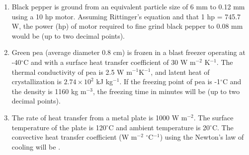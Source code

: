 \documentclass[a4paper,10pt]{article}
\begin{document}
\begin{enumerate}
    \item Black pepper is ground from an equivalent particle size of 6 mm to 0.12 mm using a 10 hp motor. Assuming Rittinger's equation and that 1 hp = 745.7 W, the power (hp) of motor required to fine grind black pepper to 0.08 mm would be \underline{\hspace{2cm}} (up to two decimal points).
    \hfill{}

    \item Green pea (average diameter 0.8 cm) is frozen in a blast freezer operating at -40$^{\circ}$C and with a surface heat transfer coefficient of 30 W m$^{-2}$ K$^{-1}$. The thermal conductivity of pea is 2.5 W m$^{-1}$K$^{-1}$, and latent heat of crystallization is $2.74 \times 10^2$ kJ kg$^{-1}$. If the freezing point of pea is -1$^{\circ}$C and the density is 1160 kg m$^{-3}$, the freezing time in minutes will be \underline{\hspace{2cm}} (up to two decimal points).
    \hfill{}

    \item The rate of heat transfer from a metal plate is 1000 W m$^{-2}$. The surface temperature of the plate is 120$^{\circ}$C and ambient temperature is 20$^{\circ}$C. The convective heat transfer coefficient (W m$^{-2}$ $^{\circ}$C$^{-1}$) using the Newton's law of cooling will be \underline{\hspace{2cm}}.
    \hfill{}
\end{enumerate}
\clearpage
\end{document}
